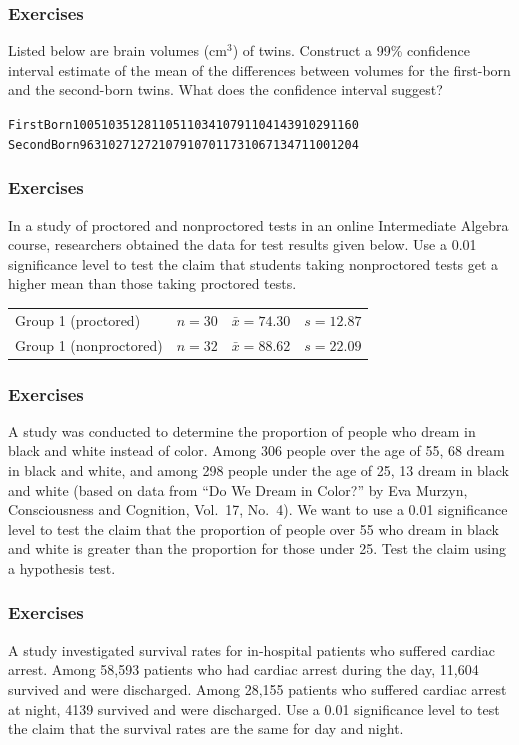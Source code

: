 \documentclass[xcolor=dvipsnames]{beamer}
\begin{document}
\begin{frame}
  \frametitle{Exercises}
{\ubung} Listed below are brain volumes
(cm$^{3}$) of twins. Construct a 99\% confidence interval estimate of
the mean of the differences between volumes for the first-born and the
second-born twins. What does the confidence interval suggest?

\begin{alltt}
\small
First Born  1005  1035  1281  1051  1034  1079  1104  1439  1029  1160
Second Born  963  1027  1272  1079  1070  1173  1067  1347  1100  1204
\end{alltt}
\end{frame}

\begin{frame}
  \frametitle{Exercises}
{\ubung} In a study of proctored
and nonproctored tests in an online Intermediate Algebra course,
researchers obtained the data for test results given below. Use a
0.01 significance level to test the claim that students taking
nonproctored tests get a higher mean than those taking proctored
tests. 

\bigskip

\begin{tabular}{llll}
  Group 1 (proctored) & $n=30$ & $\bar{x}=74.30$ & $s=12.87$ \\
  Group 1 (nonproctored) & $n=32$ & $\bar{x}=88.62$ & $s=22.09$
\end{tabular}

\end{frame}

\begin{frame}
  \frametitle{Exercises}
{\ubung} A study was conducted to determine
the proportion of people who dream in black and white instead of
color. Among 306 people over the age of 55, 68 dream in black and
white, and among 298 people under the age of 25, 13 dream in black and
white (based on data from ``Do We Dream in Color?'' by Eva Murzyn,
Consciousness and Cognition, Vol.\ 17, No.\ 4). We want to use a 0.01
significance level to test the claim that the proportion of people
over 55 who dream in black and white is greater than the proportion
for those under 25. Test the claim using a hypothesis test.
\end{frame}

\begin{frame}
  \frametitle{Exercises}
{\ubung} A study investigated
survival rates for in-hospital patients who suffered cardiac arrest.
Among 58,593 patients who had cardiac arrest during the day, 11,604
survived and were discharged. Among 28,155 patients who suffered
cardiac arrest at night, 4139 survived and were discharged. Use a 0.01
significance level to test the claim that the survival rates are the
same for day and night.
\end{frame}
\end{document}
